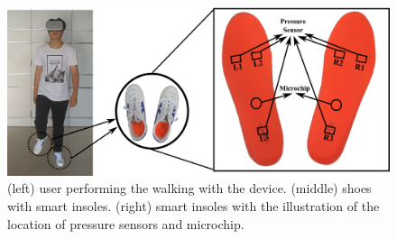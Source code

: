 \documentclass[review]{vgtc}                 %
\begin{document}
\begin{figure}
	\centering
	\includegraphics[width=\linewidth]{figs/teaser.png}
	\caption{(left) user performing the walking with the device. (middle) shoes with smart insoles. (right) smart insoles with the illustration of the location of pressure sensors and microchip.}
	\label{fig:teaser}
\end{figure}
\end{document}
